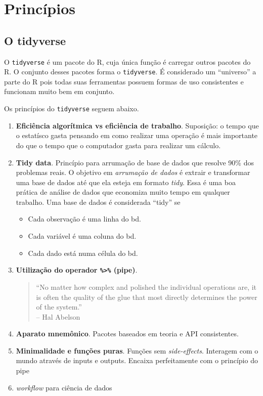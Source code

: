 \documentclass[]{book}
\providecommand{\tightlist}{%
  \setlength{\itemsep}{0pt}\setlength{\parskip}{0pt}}
\begin{document}
\chapter{Princípios}\label{principios}

\section{O tidyverse}\label{o-tidyverse}

O \texttt{tidyverse} é um pacote do R, cuja única função é carregar
outros pacotes do R. O conjunto desses pacotes forma o
\texttt{tidyverse}. É considerado um ``universo'' a parte do R pois
todas suas ferramentas possuem formas de uso consistentes e funcionam
muito bem em conjunto.

Os princípios do \texttt{tidyverse} seguem abaixo.

\begin{enumerate}
\def\labelenumi{\arabic{enumi}.}
\item
  \textbf{Eficiência algorítmica vs eficiência de trabalho}. Suposição:
  o tempo que o estatísco gasta pensando em como realizar uma operação é
  mais importante do que o tempo que o computador gasta para realizar um
  cálculo.
\item
  \textbf{Tidy data}. Princípio para arrumação de base de dados que
  resolve 90\% dos problemas reais. O objetivo em \emph{arrumação de
  dados} é extrair e transformar uma base de dados até que ela esteja em
  formato \emph{tidy}. Essa é uma boa prática de análise de dados que
  economiza muito tempo em qualquer trabalho. Uma base de dados é
  considerada ``tidy'' se

  \begin{itemize}
  \tightlist
  \item
    Cada observação é uma linha do bd.
  \item
    Cada variável é uma coluna do bd.
  \item
    Cada dado está numa célula do bd.
  \end{itemize}
\item
  \textbf{Utilização do operador \texttt{\%\textgreater{}\%} (pipe)}.

  \begin{quote}
  ``No matter how complex and polished the individual operations are, it
  is often the quality of the glue that most directly determines the
  power of the system.''\\
  -- Hal Abelson
  \end{quote}
\item
  \textbf{Aparato mnemônico}. Pacotes baseados em teoria e API
  consistentes.
\item
  \textbf{Minimalidade e funções puras}. Funções sem
  \emph{side-effects}. Interagem com o mundo através de inputs e
  outputs. Encaixa perfeitamente com o princípio do pipe
\item
  \emph{workflow} para ciência de dados
\end{enumerate}
\end{document}
